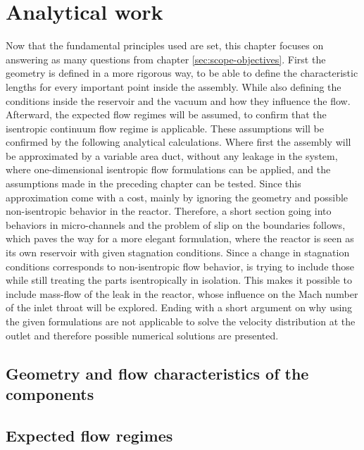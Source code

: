 \section{Analytical work}
	Now that the fundamental principles used are set, this chapter focuses on answering as many questions from chapter \ref{sec:scope-objectives}.
	First the geometry is defined in a more rigorous way, to be able to define the characteristic lengths for every important point inside the assembly.
	While also defining the conditions inside the reservoir and the vacuum and how they influence the flow.
	Afterward, the expected flow regimes will be assumed, to confirm that the isentropic continuum flow regime is applicable.
	These assumptions will be confirmed by the following analytical calculations.
	Where first the assembly will be approximated by a variable area duct, without any leakage in the system, where one-dimensional isentropic flow formulations can be applied, and the assumptions made in the preceding chapter can be tested.
	Since this approximation come with a cost, mainly by ignoring the geometry and possible non-isentropic behavior in the reactor.
	Therefore, a short section going into behaviors in micro-channels and the problem of slip on the boundaries follows, which paves the way for a more elegant formulation, where the reactor is seen as its own reservoir with given stagnation conditions.
	Since a change in stagnation conditions corresponds to non-isentropic flow behavior, is trying to include those while still treating the parts isentropically in isolation.
	This makes it possible to include mass-flow of the leak in the reactor, whose influence on the Mach number of the inlet throat will be explored.
	Ending with a short argument on why using the given formulations are not applicable to solve the velocity distribution at the outlet and therefore possible numerical solutions are presented.

\subsection{Geometry and flow characteristics of the components}\label{sec:geometry}
	
	\newpage

\subsection{Expected flow regimes}\label{sec:expected-flow-regimes}
	
	\newpage

